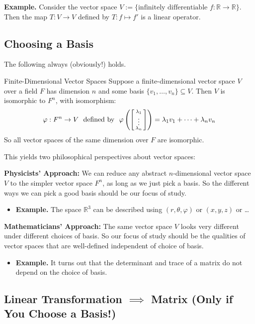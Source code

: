 \textbf{Example.} Consider the vector space $V := \{\text{infinitely differentiable } f: \mathbb{R} \to \mathbb{R} \}$.  Then the map $T: V \to V$ defined by $T: f \mapsto f'$ is a linear operator.

\subsection{Choosing a Basis}

The following always (obviously!) holds.

\begin{theorem}{Finite-Dimensional Vector Spaces}
    Suppose a finite-dimensional vector space $V$ over a field $F$ has dimension $n$ and some basis $\{v_1, \dots, v_n\} \subseteq V$.  Then $V$ is isomorphic to $F^n$, with isomorphism:
    \[ \varphi: F^n \to V ~ \text{ defined by } ~ \varphi\left(\begin{bsmallmatrix} \lambda_1 \\ \vdots \\ \lambda_n \end{bsmallmatrix}\right) = \lambda_1v_1 + \dots + \lambda_n v_n \]
    So all vector spaces of the same dimension over $F$ are isomorphic.
\end{theorem}

This yields two philosophical perspectives about vector spaces:

\textbf{Physicists' Approach:} We can reduce any abstract $n$-dimensional vector space $V$ to the simpler vector space $F^n$, as long as we just pick a basis.  So the different ways we can pick a good basis should be our focus of study.
    \begin{itemize}
        \item \textbf{Example.} The space $\mathbb{R}^3$ can be described using $(r, \theta, \varphi)$ or $(x, y, z)$ or \dots
    \end{itemize}
\textbf{Mathematicians' Approach:} The same vector space $V$ looks very different under different choices of basis.  So our focus of study should be the qualities of vector spaces that are well-defined independent of choice of basis.
    \begin{itemize}
        \item \textbf{Example.} It turns out that the determinant and trace of a matrix do not depend on the choice of basis.
    \end{itemize}

\subsection{Linear Transformation $\implies$ Matrix (Only if You Choose a Basis!)}


